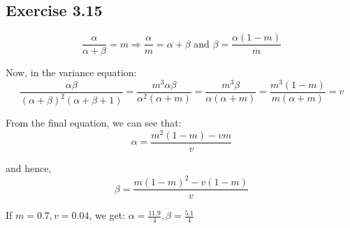 \documentclass{article}
\begin{document}
\subsection*{Exercise 3.15}
\begin{flushleft}
\[\frac{\alpha}{\alpha + \beta} = m \Rightarrow \frac{\alpha}{m} = \alpha + \beta \text{ and } \beta = \frac{\alpha(1 - m)}{m}\]

Now, in the variance equation:
\begin{equation}
\frac{\alpha \beta}{(\alpha + \beta)^{2} (\alpha + \beta + 1)} = \frac{m^3 \alpha \beta}{\alpha^{2} (\alpha + m)} = \frac{m^3 \beta}{\alpha (\alpha + m)} = \frac{m^3 (1 - m)}{m(\alpha + m)} = v
\end{equation}

From the final equation, we can see that:
\begin{equation}
\alpha = \frac{m^{2}(1 - m) - vm}{v}
\end{equation}

and hence,
\begin{equation}
\beta = \frac{m(1 - m)^{2} - v(1 - m)}{v}
\end{equation}

If \(m = 0.7, v = 0.04\), we get: \(\alpha = \frac{11.9}{4}, \beta = \frac{5.1}{4}\)
\end{flushleft}
\end{document}
